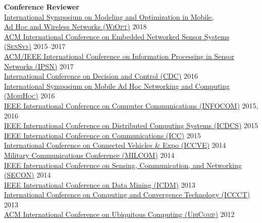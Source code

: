 {\bf Conference Reviewer}\\
{\href{http://www.wi-opt.org/}{International Symposium on Modeling and Optimization in Mobile, \\\mbox{\hspace{0.4cm}} Ad Hoc and Wireless Networks (\textsc{WiOpt})}} \hfill 2018\\
{\href{http://sensys.acm.org}{ACM International Conference on Embedded Networked Sensor Systems (\textsc{SenSys})}} \hfill 2015--2017\\
{\href{http://ipsn.acm.org/2017/}{ACM/IEEE International Conference on Information Processing in Sensor Networks (\textsc{IPSN})}} \hfill 2017\\
{\href{http://cdc2016.ieeecss.org/}{International Conference on Decision and Control (\textsc{CDC})}} \hfill 2016\\
{\href{http://www.sigmobile.org/mobihoc/2016/}{International Symposium on Mobile Ad Hoc Networking and Computing (\textsc{MobiHoc})}} \hfill 2016\\
{\href{http://infocom2016.ieee-infocom.org/}{IEEE International Conference on Computer Communications (\textsc{INFOCOM})}} \hfill 2015, 2016\\
{\href{http://icdcs-2015.cse.ohio-state.edu/}{IEEE International Conference on Distributed Computing Systems (\textsc{ICDCS})}} \hfill 2015\\
{\href{http://icc2015.ieee-icc.org/}{IEEE International Conference on Communications (\textsc{ICC})}} \hfill 2015\\
{\href{http://www.iccve.org/2014/}{International Conference on Connected Vehicles \& Expo (\textsc{ICCVE})}} \hfill 2014\\
{\href{http://www.milcom.org/2014/}{Military Communications Conference (\textsc{MILCOM})}} \hfill 2014\\
{\href{http://secon2014.ieee-secon.org}{IEEE International Conference on Sensing, Communication, and Networking (\textsc{SECON})}} \hfill 2014\\
{\href{http://icdm2013.rutgers.edu}{IEEE International Conference on Data Mining (\textsc{ICDM})}} \hfill 2013\\
{\href{http://www.mnnit.ac.in/iccct2013}{International Conference on Computing and Convergence Technology (\textsc{ICCCT})}} \hfill 2013\\
{\href{http://www.ubicomp.org/ubicomp2012}{ACM International Conference on Ubiquitous Computing (\textsc{UbiComp})}} \hfill 2012\\
\vspace{-0.6cm}


